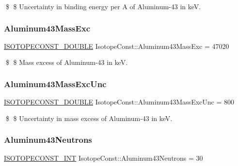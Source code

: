 \$ \$ Uncertainty in binding energy per A of Aluminum-\/43 in keV. \mbox{\label{group___isotope_const-_aluminum-_al43_ga3ae4867d245fabea39d84daa31f5eb82}} 
\subsubsection{\texorpdfstring{Aluminum43\+Mass\+Exc}{Aluminum43MassExc}}
{\footnotesize\ttfamily \mbox{\hyperlink{group___isotope_const-_macros_ga8f45a7272ce02c0b4c65c44636ed719a}{I\+S\+O\+T\+O\+P\+E\+C\+O\+N\+S\+T\+\_\+\+D\+O\+U\+B\+LE}} Isotope\+Const\+::\+Aluminum43\+Mass\+Exc = 47020}

\$ \$ Mass excess of Aluminum-\/43 in keV. \mbox{\label{group___isotope_const-_aluminum-_al43_gafbb9e695eae6f75ed89dc600435dc9d9}} 
\subsubsection{\texorpdfstring{Aluminum43\+Mass\+Exc\+Unc}{Aluminum43MassExcUnc}}
{\footnotesize\ttfamily \mbox{\hyperlink{group___isotope_const-_macros_ga8f45a7272ce02c0b4c65c44636ed719a}{I\+S\+O\+T\+O\+P\+E\+C\+O\+N\+S\+T\+\_\+\+D\+O\+U\+B\+LE}} Isotope\+Const\+::\+Aluminum43\+Mass\+Exc\+Unc = 800}

\$ \$ Uncertainty in mass excess of Aluminum-\/43 in keV. \mbox{\label{group___isotope_const-_aluminum-_al43_ga69345477c86e84fdc9bbe6d2b6b639d1}} 
\subsubsection{\texorpdfstring{Aluminum43\+Neutrons}{Aluminum43Neutrons}}
{\footnotesize\ttfamily \mbox{\hyperlink{group___isotope_const-_macros_ga5f18360b3e99483a35c32d789e62621c}{I\+S\+O\+T\+O\+P\+E\+C\+O\+N\+S\+T\+\_\+\+I\+NT}} Isotope\+Const\+::\+Aluminum43\+Neutrons = 30}


